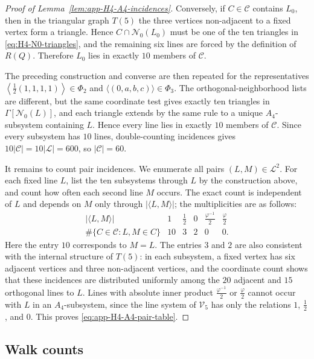 \documentclass[11pt]{article}
\theoremstyle{definition}
\begin{document}
\begin{proof}[Proof of Lemma~\ref{lem:app-H4-A4-incidences}]
Conversely, if \(C\in\mathcal C\) contains \(L_{0}\), then in the triangular
graph \(T(5)\) the three vertices non-adjacent to a fixed vertex form a
triangle.  Hence \(C\cap\mathcal N_{0}(L_{0})\) must be one of the ten
triangles in \eqref{eq:H4-N0-triangles}, and the remaining six lines are
forced by the definition of \(R(Q)\).  Therefore \(L_{0}\) lies in exactly
\(10\) members of \(\mathcal C\).

The preceding construction and converse are then repeated for the
representatives
\(\left\langle\frac{1}{2}(1,1,1,1)\right\rangle\in\Phi_{2}\) and
\(\langle(0,a,b,c)\rangle\in\Phi_{3}\).  The
orthogonal-neighborhood lists are different, but the same coordinate test
gives exactly ten triangles in \(\Gamma[\mathcal N_{0}(L)]\), and each
triangle extends by the same rule to a unique \(A_{4}\)-subsystem
containing \(L\).  Hence every line lies in exactly \(10\) members of
\(\mathcal C\).  Since every subsystem has \(10\) lines,
double-counting incidences gives \(10|\mathcal C|=10|\mathcal L|=600\),
so \(|\mathcal C|=60\).

It remains to count pair incidences.  We enumerate all pairs
\((L,M)\in\mathcal L^{2}\).  For each fixed line \(L\), list the ten
subsystems through \(L\) by the construction above, and count how often
each second line \(M\) occurs.  The exact count is independent of \(L\) and
depends on \(M\) only through \(|\langle L,M\rangle|\); the multiplicities
are as follows:
\[
\begin{array}{c|ccccc}
|\langle L,M\rangle|
& 1 & \frac{1}{2} & 0 & \frac{\varphi^{-1}}{2} & \frac{\varphi}{2}\\
\hline
\#\{C\in\mathcal C:L,M\in C\}
&10&3&2&0&0 .
\end{array}
\]
Here the entry \(10\) corresponds to \(M=L\).  The entries \(3\) and \(2\)
are also consistent with the internal structure of \(T(5)\): in each
subsystem, a fixed vertex has six adjacent vertices and three non-adjacent
vertices, and the coordinate count shows that these incidences are
distributed uniformly among the \(20\) adjacent and \(15\) orthogonal lines
to \(L\).  Lines with absolute inner product \(\frac{\varphi^{-1}}{2}\) or
\(\frac{\varphi}{2}\) cannot occur with \(L\) in an \(A_{4}\)-subsystem, since the
line system of \(\mathcal V_{5}\) has only the relations \(1\),
\(\frac{1}{2}\), and \(0\).
This proves \eqref{eq:app-H4-A4-pair-table}.
\end{proof}

\subsection{Walk counts}
\label{app:H4-walk-counts}
\end{document}
